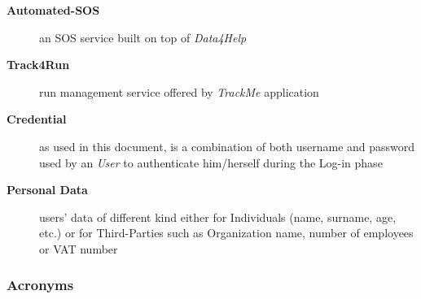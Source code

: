 \documentclass[a4paper]{article}
\begin{document}
\begin{description}
                    \item[\textbf{Automated-SOS}] an SOS service built on top of \textit{Data4Help}
                    
                    \item[\textbf{Track4Run}] run management service offered by \textit{TrackMe} application
                    
                    \item[\textbf{Credential}] as used in this document, is a combination of both username and password used by an \textit{User} to authenticate him/herself during the Log-in phase
                    
                    \item[\textbf{Personal Data}] users' data of different kind either for Individuals (name, surname, age, etc.) or for Third-Parties such as Organization name, number of employees or VAT number
                \end{description}
            
            \subsubsection{Acronyms}
            \begin{acronym}
            \end{acronym}
            
\end{document}
